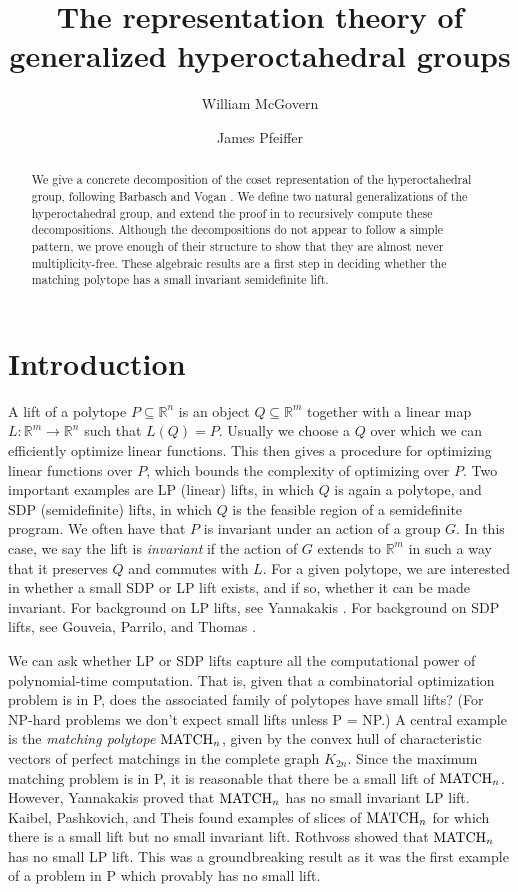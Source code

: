 \documentclass[12pt]{amsart}
\title{The representation theory of generalized hyperoctahedral groups}
\author{William McGovern}
\author{James Pfeiffer}
\numberwithin{theorem}{section}
\newcommand{\RR}{\mathbb{R}}
\newcommand{\MATCH}{\textup{MATCH}}
\begin{document}
\begin{abstract}
We give a concrete decomposition of the coset representation of the hyperoctahedral group, following Barbasch and Vogan \cite{bv}.
We define two natural generalizations of the hyperoctahedral group, and extend the proof in \cite{bv} to recursively compute these decompositions.
Although the decompositions do not appear to follow a simple pattern, we prove enough of their structure to show that they are almost never multiplicity-free.
These algebraic results are a first step in deciding whether the matching polytope has a small invariant semidefinite lift.
\end{abstract}
\maketitle

\section{Introduction} \label{BV:Introduction}

A lift of a polytope $P \subseteq \RR^n$ is an object $Q \subseteq \RR^m$ together with a linear map $L: \RR^m \to \RR^n$ such that $L(Q) = P$.
Usually we choose a $Q$ over which we can efficiently optimize linear functions.
This then gives a procedure for optimizing linear functions over $P$, which bounds the complexity of optimizing over $P$.
Two important examples are LP (linear) lifts, in which $Q$ is again a polytope, and SDP (semidefinite) lifts, in which $Q$ is the feasible region of a semidefinite program.
We often have that $P$ is invariant under an action of a group $G$.
In this case, we say the lift is {\em invariant} if the action of $G$ extends to $\RR^m$ in such a way that it preserves $Q$ and commutes with $L$.
For a given polytope, we are interested in whether a small SDP or LP lift exists, and if so, whether it can be made invariant.
For background on LP lifts, see Yannakakis \cite{yannakakis1988expressing}.
For background on SDP lifts, see Gouveia, Parrilo, and Thomas \cite{gpt}.

We can ask whether LP or SDP lifts capture all the computational power of polynomial-time computation.
That is, given that a combinatorial optimization problem is in P, does the associated family of polytopes have small lifts?
(For NP-hard problems we don't expect small lifts unless P = NP.)
A central example is the {\em matching polytope} $\MATCH_n$, given by the convex hull of characteristic vectors of perfect matchings in the complete graph $K_{2n}$.
Since the maximum matching problem is in P, it is reasonable that there be a small lift of $\MATCH_n$.
However, Yannakakis \cite{yannakakis1988expressing} proved that $\MATCH_n$ has no small invariant LP lift.
Kaibel, Pashkovich, and Theis \cite{kaibel2010symmetry} found examples of slices of $\MATCH_n$ for which there is a small lift but no small invariant lift.
Rothvoss \cite{rothvoss2013matching} showed that $\MATCH_n$ has no small LP lift.
This was a groundbreaking result as it was the first example of a problem in P which provably has no small lift.
\end{document}
